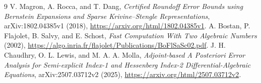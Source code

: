 \documentclass[aps,pra,reprint,onecolumn,10pt,notitlepage,nofootinbib]{revtex4-2}
\begin{document}
\begin{thebibliography}{9}
V. Magron, A. Rocca, and T. Dang,
\emph{Certified Roundoff Error Bounds using Bernstein Expansions and Sparse
Krivine--Stengle Representations}, arXiv:1802.04385v1 (2018),
\url{https://arxiv.org/html/1802.04385v1}.
A. Bostan, P. Flajolet, B. Salvy, and E. Schost,
\emph{Fast Computation With Two Algebraic Numbers} (2002),
\url{https://algo.inria.fr/flajolet/Publications/BoFlSaSc02.pdf}.
J. H. Chaudhry, O. L. Lewis, and M. A. A. Molla,
\emph{Adjoint-based A Posteriori Error Analysis for Semi-explicit Index-1
and Hessenberg Index-2 Differential-Algebraic Equations},
arXiv:2507.03712v2 (2025), \url{https://arxiv.org/html/2507.03712v2}.
\end{thebibliography}
\end{document}
